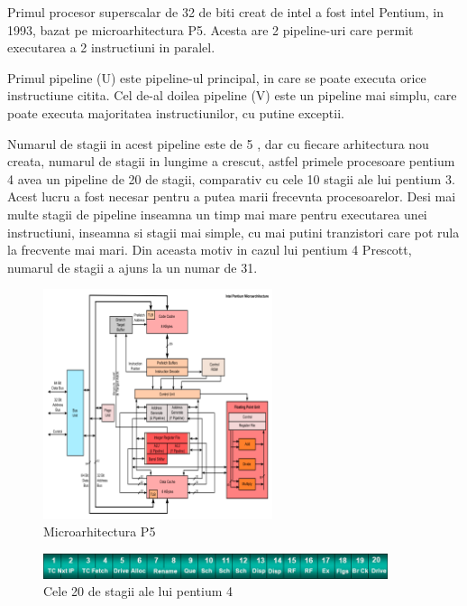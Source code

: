 Primul procesor superscalar de 32 de biti creat de intel a fost intel Pentium, in 1993, bazat pe
microarhitectura P5. Acesta are 2 pipeline-uri care permit executarea a 2 instructiuni in paralel.

Primul pipeline (U) este pipeline-ul principal, in care se poate executa orice instructiune
citita. Cel de-al doilea pipeline (V) este un pipeline mai simplu, care poate executa majoritatea
instructiunilor, cu putine exceptii\cite{palacharla1997complexity}.

Numarul de stagii in acest pipeline este de 5 \cite{hwu1993superblock}, dar cu fiecare arhitectura nou creata, numarul de
stagii in lungime a crescut, astfel primele procesoare pentium 4 avea un pipeline de 20 de stagii,
comparativ cu cele 10 stagii ale lui pentium 3. Acest lucru a fost necesar pentru a putea marii
frecevnta procesoarelor. Desi mai multe stagii de pipeline inseamna un timp mai mare pentru
executarea unei instructiuni, inseamna si stagii mai simple, cu mai putini tranzistori care pot
rula la frecvente mai mari. Din aceasta motiv in cazul lui pentium 4 Prescott, numarul de stagii a
ajuns la un numar de 31.

\begin{figure}[ht] \centering
\includegraphics[width=0.6\textwidth]{img/pentiumarch.png}
\caption{Microarhitectura P5} \end{figure}

\begin{figure}[ht] \centering
\includegraphics[width=0.9\textwidth]{img/pentium4pipeline.jpg}
\caption{Cele 20 de stagii ale lui pentium 4} \end{figure}

